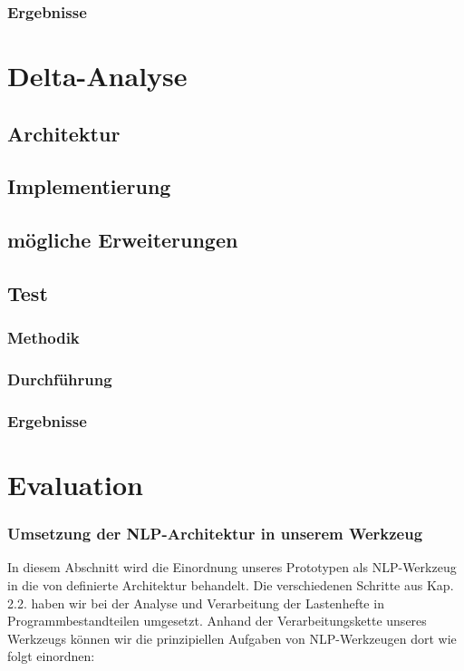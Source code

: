 \documentclass[12pt]{report}
\begin{document}
\subsection{Ergebnisse}
\chapter{Delta-Analyse}
\section{Architektur}
\section{Implementierung}
\section{mögliche Erweiterungen}
\section{Test}
\subsection{Methodik}
\subsection{Durchführung}
\subsection{Ergebnisse}
\chapter{Evaluation}
\subsection{Umsetzung der NLP-Architektur in unserem Werkzeug}
In diesem Abschnitt wird die Einordnung unseres Prototypen als NLP-Werkzeug in die von \cite{cop04} definierte Architektur behandelt. Die verschiedenen Schritte aus Kap. 2.2. haben wir bei der Analyse und Verarbeitung der Lastenhefte in Programmbestandteilen umgesetzt. Anhand der Verarbeitungskette unseres Werkzeugs können wir die prinzipiellen Aufgaben von NLP-Werkzeugen dort wie folgt einordnen:
\end{document}
